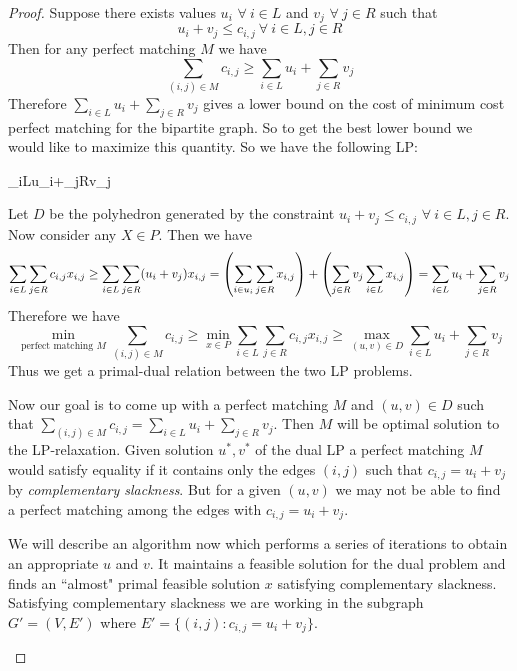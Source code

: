 \documentclass[twoside]{article}
\begin{document}
\begin{proof}
	Suppose there exists values $u_i$ $\forall\ i\in L$ and $v_j$ $\forall\ j\in R$ such that $$u_i+v_j\leq c_{i,j}\ \forall\ i\in L, j\in R$$Then for any perfect matching $M$ we have $$\sum_{(i,j)\in M}c_{i,j}\geq \sum_{i\in L}u_i+\sum_{j\in R}v_j$$Therefore $\sum\limits_{i\in L}u_i+\sum\limits_{j\in R}v_j$ gives a lower bound on the cost of minimum cost perfect matching for the bipartite graph. So to get the best lower bound we would like to maximize this quantity. So we have the following LP:
	\begin{maxi*}{}{\sum_{i\in L}u_i+\sum_{j\in R}v_j}{}{}
	\end{maxi*}Let $D$ be the polyhedron generated by the constraint $u_i+v_j\leq c_{i,j}$ $\forall\ i\in L,j\in R$. Now consider any $X\in P$. Then we have $$\sum_{i\in L}\sum_{j\in R}c_{i,j}x_{i,j}\geq \sum_{i\in L}\sum_{j\in R}(u_i+v_j)x_{i,j}=\left(\sum_{i\in u_i}\sum_{j\in R}x_{i,j}\right)+\left(\sum_{j\in R}v_j\sum_{i\in L}x_{i,j}\right)=\sum_{i\in L}u_i+\sum_{j\in R}v_j$$Therefore we have $$\min\limits_{\text{perfect matching $M$}}\sum_{(i,j)\in M}c_{i,j}\geq \min\limits_{x\in P}\sum_{i\in L}\sum_{j\in R}c_{i,j}x_{i,j}\geq \max\limits_{(u,v)\in D}\sum_{i\in L}u_i+\sum_{j\in R}v_j$$Thus we get a primal-dual relation between the two LP problems.
	
	Now our goal is to come up with a perfect matching $M$ and $(u,v)\in D$ such that $\sum\limits_{(i,j)\in M}c_{i,j}=\sum\limits_{i\in L}u_i+\sum\limits_{j\in R}v_j$. Then $M$ will be optimal solution to the LP-relaxation. Given solution $u^*,v^*$ of the dual LP a perfect matching $M$ would satisfy equality if it contains only the edges $(i,j)$ such that $c_{i,j}=u_i+v_j$ by \textit{complementary slackness}. But for a given $(u,v)$ we may not be able to find a perfect matching among the edges with $c_{i,j}=u_i+v_j$. 
	
	We will describe an algorithm now which performs a series of iterations to obtain an appropriate $u$ and $v$. It maintains a feasible solution for the dual problem and finds an ``almost" primal feasible solution $x$ satisfying complementary slackness. Satisfying complementary slackness we are working in the subgraph $G'=(V,E')$ where $E'=\{(i,j)\colon c_{i,j}=u_i+v_j\}$.
	\begin{algorithm}\DontPrintSemicolon
		\caption{}
	\end{algorithm}
	

\end{proof}
\end{document}
